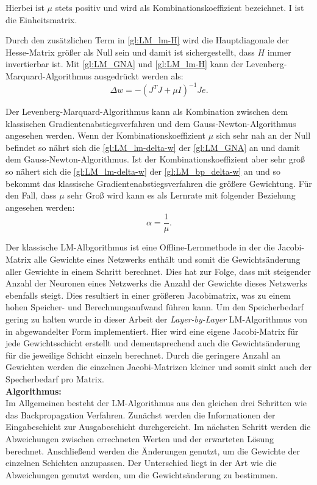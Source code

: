 Hierbei ist $\mu$ stets positiv und wird als Kombinationskoeffizient bezeichnet. I ist die Einheitsmatrix.

Durch den zusätzlichen Term in \autoref{gl:LM_lm-H} wird die Hauptdiagonale der Hesse-Matrix größer als Null sein und damit ist sichergestellt, dass $H$ immer invertierbar ist. Mit \autoref{gl:LM_GNA} und \autoref{gl:LM_lm-H} kann der Levenberg-Marquard-Algorithmus ausgedrückt werden als:
\begin{equation}
\Delta w =-(J^T J + \mu I)^{-1} J e.
\label{gl:LM_lm-delta-w}
\end{equation}

Der Levenberg-Marquard-Algorithmus kann als Kombination zwischen dem klassischen Gradientenabstiegsverfahren und dem Gauss-Newton-Algorithmus angesehen werden. Wenn der Kombinationskoeffizient $\mu$ sich sehr nah an der Null befindet so nährt sich die \autoref{gl:LM_lm-delta-w} der \autoref{gl:LM_GNA} an und damit dem Gauss-Newton-Algorithmus. Ist der Kombinationskoeffizient aber sehr groß so nähert sich die \autoref{gl:LM_lm-delta-w} der \autoref{gl:LM_bp_delta-w} an und so bekommt das klassische Gradientenabstiegsverfahren die größere Gewichtung. Für den Fall, dass $\mu$ sehr Groß wird kann es als Lernrate mit folgender Beziehung angesehen werden:\,
\begin{equation}
\alpha = \frac{1}{\mu}.
\label{gl:LM_lernrate}
\end{equation}

Der klassische LM-Albgorithmus ist eine Offline-Lernmethode in der die Jacobi-Matrix alle Gewichte eines Netzwerks enthält und somit die Gewichtsänderung aller Gewichte in einem Schritt berechnet. Dies hat zur Folge, dass mit steigender Anzahl der Neuronen eines Netzwerks die Anzahl der Gewichte dieses Netzwerks ebenfalls steigt. Dies resultiert in einer größeren Jacobimatrix, was zu einem hohen Speicher- und Berechnungsaufwand führen kann. Um den Speicherbedarf gering zu halten wurde in dieser Arbeit der \textit{Layer-by-Layer} LM-Algorithmus von \citet{Kwak2012} in abgewandelter Form implementiert. Hier wird eine eigene Jacobi-Matrix für jede Gewichtsschicht erstellt und dementsprechend auch die Gewichtsänderung für die jeweilige Schicht einzeln berechnet. Durch die geringere Anzahl an Gewichten werden die einzelnen Jacobi-Matrizen kleiner und somit sinkt auch der Specherbedarf pro Matrix.\\

\textbf{Algorithmus:}\,\\
Im Allgemeinen besteht der LM-Algorithmus aus den gleichen drei Schritten wie das Backpropagation Verfahren. Zunächst werden die Informationen der Eingabeschicht zur Ausgabeschicht durchgereicht. Im nächsten Schritt werden die Abweichungen zwischen errechneten Werten und der erwarteten Lösung berechnet. Anschließend werden die Änderungen genutzt, um die Gewichte der einzelnen Schichten anzupassen. Der Unterschied liegt in der Art wie die Abweichungen genutzt werden, um die Gewichtsänderung zu bestimmen.


